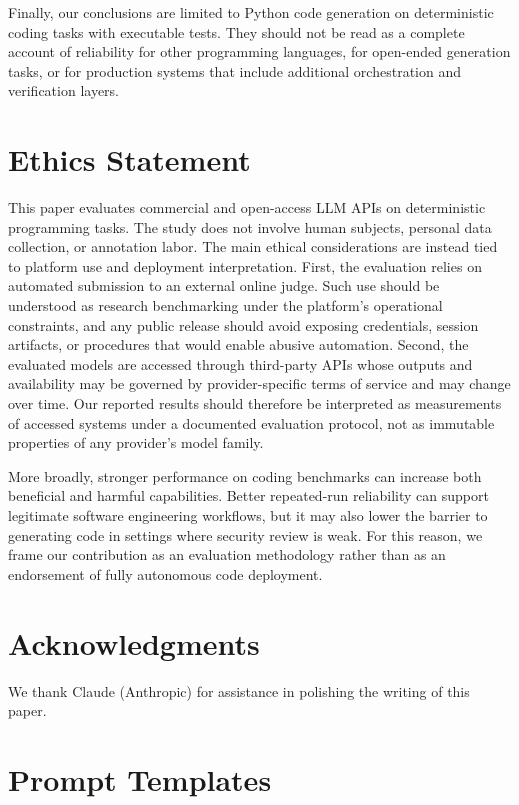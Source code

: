 \documentclass[11pt]{article}
\begin{document}
Finally, our conclusions are limited to Python code generation on deterministic coding tasks with executable tests. They should not be read as a complete account of reliability for other programming languages, for open-ended generation tasks, or for production systems that include additional orchestration and verification layers.

\section*{Ethics Statement}

This paper evaluates commercial and open-access LLM APIs on deterministic programming tasks. The study does not involve human subjects, personal data collection, or annotation labor. The main ethical considerations are instead tied to platform use and deployment interpretation. First, the evaluation relies on automated submission to an external online judge. Such use should be understood as research benchmarking under the platform's operational constraints, and any public release should avoid exposing credentials, session artifacts, or procedures that would enable abusive automation. Second, the evaluated models are accessed through third-party APIs whose outputs and availability may be governed by provider-specific terms of service and may change over time. Our reported results should therefore be interpreted as measurements of accessed systems under a documented evaluation protocol, not as immutable properties of any provider's model family.

More broadly, stronger performance on coding benchmarks can increase both beneficial and harmful capabilities. Better repeated-run reliability can support legitimate software engineering workflows, but it may also lower the barrier to generating code in settings where security review is weak. For this reason, we frame our contribution as an evaluation methodology rather than as an endorsement of fully autonomous code deployment.

\section*{Acknowledgments}

We thank Claude (Anthropic) for assistance in polishing the writing of this paper.



\appendix

\section{Prompt Templates}
\end{document}

